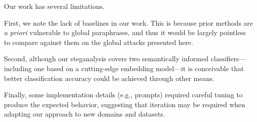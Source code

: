 Our work has several limitations.

First, we note the lack of baselines in our work. This is because prior methods are \emph{a priori} vulnerable to global paraphrases, and thus it would be largely pointless to compare against them on the global attacks presented here.

Second, although our steganalysis covers two semantically informed classifiers---including one based on a cutting-edge embedding model---it is conceivable that better classification accuracy could be achieved through other means.

Finally, some implementation details (e.g., prompts) required careful tuning to produce the expected behavior, suggesting that iteration may be required when adapting our approach to new domains and datasets.



